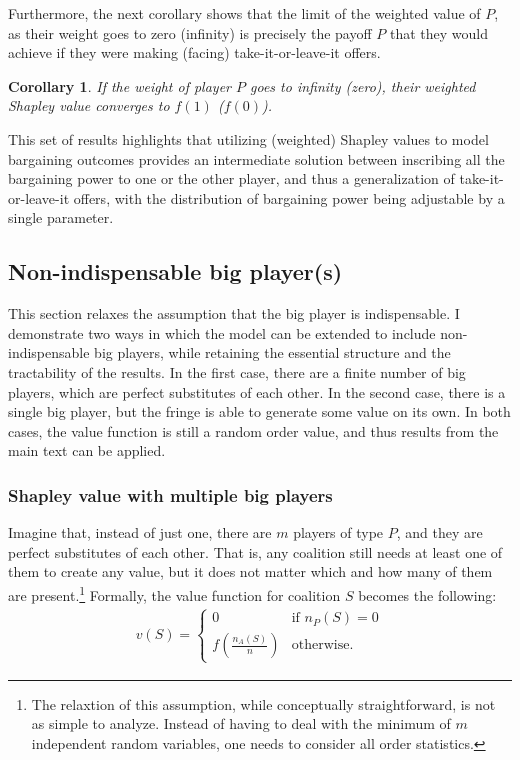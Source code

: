 \documentclass[a4paper]{article}
\newtheorem{corollary}{Corollary}
\begin{document}
Furthermore, the next corollary shows that the limit of the weighted value of $P$, as their weight goes to zero (infinity) is precisely the payoff $P$ that they would achieve if they were making (facing) take-it-or-leave-it offers.
\begin{corollary}
    \label{cor:paltform_value_weighted_2}
    If the weight of player $P$ goes to infinity (zero), their weighted Shapley value converges to $f(1)$ ($f(0)$).
\end{corollary}
This set of results highlights that utilizing (weighted) Shapley values to model bargaining outcomes provides an intermediate solution between inscribing all the bargaining power to one or the other player, and thus a generalization of take-it-or-leave-it offers, with the distribution of bargaining power being adjustable by a single parameter.


\subsection{Non-indispensable big player(s)}
\label{sec:extensions}

This section relaxes the assumption that the big player is indispensable.
I demonstrate two ways in which the model can be extended to include non-indispensable big players, while retaining the essential structure and the tractability of the results.
In the first case, there are a finite number of big players, which are perfect substitutes of each other.
In the second case, there is a single big player, but the fringe is able to generate some value on its own.
In both cases, the value function is still a random order value, and thus results from the main text can be applied. %

\subsubsection{Shapley value with multiple big players}

Imagine that, instead of just one, there are $m$ players of type $P$, and they are perfect substitutes of each other.
That is, any coalition still needs at least one of them to create any value, but it does not matter which and how many of them are present.\footnote{
    The relaxtion of this assumption, while conceptually straightforward, is not as simple to analyze.
    Instead of having to deal with the minimum of $m$ independent random variables, one needs to consider all order statistics.
}
Formally, the value function for coalition $S$ becomes the following:
\begin{align*}
    v(S) = \begin{cases}
        0                              & \text{if } n_P(S) = 0 \\
        f\left(\frac{n_A(S)}{n}\right) & \text{otherwise}.
    \end{cases}
\end{align*}
\end{document}
